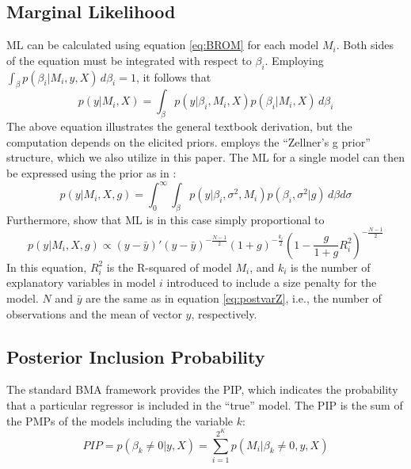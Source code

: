\documentclass[a4paper,11pt]{article}
\begin{document}
\subsection*{Marginal Likelihood}\label{sec:ML}
ML can be calculated using equation \ref{eq:BROM} for each model $M_{i}$. Both sides of the equation must be integrated with respect to $\beta_{i}$. Employing $\int_{\beta} p(\beta_{i}\vert M_{i},y,X) \, d\beta_{i}=1$, it follows that
%
\begin{equation}\label{eq:ML}
p(y \vert  M_{i},X) = \int_{\beta}{p(y \vert \beta_{i},M_{i},X)p(\beta_{i} \vert M_{i},X) \, d\beta_{i}}
\end{equation}
The above equation illustrates the general textbook derivation, but the computation depends on the elicited priors. \citet{Zeugner2011} employs the ``Zellner's g prior'' structure, which we also utilize in this paper. The ML for a single model can then be expressed using the prior as in \citet{FeldkircherZeugner2009}:
\begin{equation}\label{eq:MLFZ}
p(y \vert  M_{i},X,g) = \int_{0}^{\infty}{\int_{\beta}{p(y \vert \beta_{i}, \sigma^{2},M_{i})p(\beta_{i},\sigma^{2} \vert g) \, d\beta d\sigma}}
\end{equation}
Furthermore, \citet{FeldkircherZeugner2009} show that ML is in this case simply proportional to
%
\begin{equation}
\label{eq:MLg}
p(y \vert M_{i}, X, g) \propto (y-\bar{y})'(y-\bar{y})^{- \frac{N-1}{2}} (1+g)^{- \frac{k_{i}}{2}} \left(1- \frac{g}{1+g}R^{2}_{i} \right)^{- \frac{N-1}{2}}
\end{equation}
In this equation, $R^{2}_{i}$ is the R-squared of model $M_{i}$, and $k_{i}$ is the number of explanatory variables in model $i$ introduced to include a size penalty for the model. $N$ and $\bar{y}$ are the same as in equation \ref{eq:postvarZ}, i.e., the number of observations and the mean of vector $y$, respectively.
\subsection*{Posterior Inclusion Probability}
The standard \ac{BMA} framework provides the \ac{PIP}, which indicates the probability that a particular regressor is included in the ``true'' model. The \ac{PIP} is the sum of the \ac{PMP}s of the models including the variable $k$:
\begin{equation}\label{PIP}
PIP = p(\beta_{k} \neq 0 \vert y, X) = \sum_{i=1}^{2^{K}} p(M_{i} \vert \beta_{k} \neq 0, y, X)
\end{equation}
\end{document}
